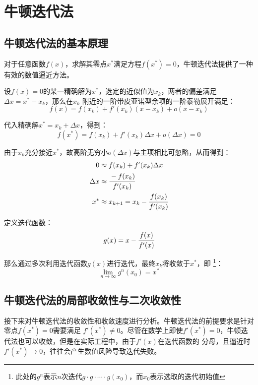 \newpage
\section{牛顿迭代法}
\label{sec:牛顿迭代法}
\subsection{牛顿迭代法的基本原理}
\label{sec:牛顿迭代法的基本原理}
对于任意函数\(f(x)\)，求解其零点\(x^*\)满足方程\(f(x^*)=0\)，牛顿迭代法提供了一种有效的数值逼近方法。

设\(f(x)=0\)的某一精确解为\(x^*\)，选定的近似值为\(x_k\)，两者的偏差满足\(\Delta x=x^*-x_k\)，那么在\(x_k\)
附近的一阶带皮亚诺型余项的一阶泰勒展开满足：
\begin{equation*}
    f(x)=f(x_k)+f'(x_k)(x-x_k)+o(x-x_k)
\end{equation*}

代入精确解\(x^*=x_k+\Delta x\)，得到：
\begin{equation*}
    f(x^*)=f(x_k)+f'(x_k)\Delta x+o(\Delta x)=0
\end{equation*}

由于\(x_k\)充分接近\(x^*\)，故高阶无穷小\(o(\Delta x)\)与主项相比可忽略，从而得到：
\begin{align*}
   0&\approx f(x_k)+f'(x_k)\Delta x\\
   \Delta x&\approx\cfrac{-f(x_k)}{f'(x_k)}\\
   x^*&\approx x_{k+1}=x_k-\cfrac{f(x_k)}{f'(x_k)}
\end{align*}

定义迭代函数：
\begin{equation}
    g(x)=x-\cfrac{f(x)}{f'(x)}
    \label{eq:牛顿迭代法迭代函数}
\end{equation}

那么通过多次利用迭代函数\(g(x)\)进行迭代，最终\(x_k\)将收敛于\(x^*\)，即
\footnote{此处的\(g^n\)表示\(n\)次迭代\(g\cdot g\cdot \cdots\cdot g(x_0)\)，而\(x_0\)表示选取的迭代初始值}：
\begin{equation*}
    \lim\limits_{n\to\infty}g^n(x_0)=x^*
\end{equation*}

\subsection{牛顿迭代法的局部收敛性与二次收敛性}
接下来对牛顿迭代法的收敛性和收敛速度进行分析。牛顿迭代法的前提要求是针对零点\(f(x^*)=0\)需要满足
\(f'(x^*)\ne 0\)。尽管在数学上即使\(f'(x^*)=0\)，牛顿迭代法也可以收敛，但是在实际工程中，由于\(f'(x)\)在迭代函数的
分母，且逼近时\(f'(x^*)\to 0\)，往往会产生数值风险导致迭代失败。

